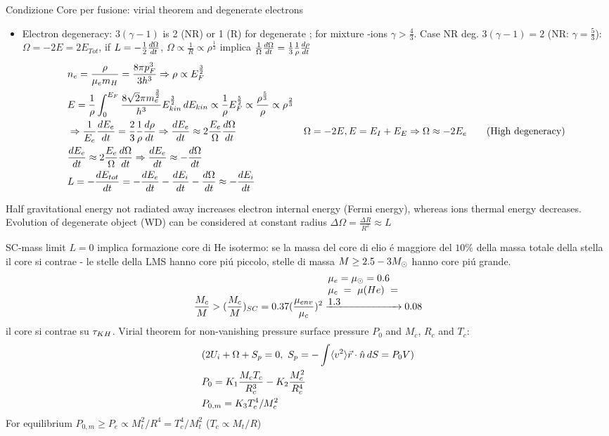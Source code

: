 \begin{frame}{Condizione Core per fusione: virial theorem and degenerate electrons}
    \begin{itemize}
        \item Electron degeneracy: $3(\gamma-1)$ is 2 (NR) or 1 (R) for degenerate \Pelectron; for mixture \Pelectron-ions $\gamma>\frac{4}{3}$. Case NR \Pelectron deg. $3(\gamma-1)=2$  (NR: $\gamma=\frac{5}{3}$): $\Omega=-2E=2E_{Tot}$, if $L=-\frac{1}{2}\TDy{t}{\Omega}$, $\Omega\propto \frac{1}{R}\propto\rho^{\frac{1}{3}}$ implica $\frac{1}{\Omega}\TDy{t}{\Omega}=\frac{1}{3}\frac{1}{\rho}\TDy{t}{\rho}$     
            \begin{align*}
                &n_e=\frac{\rho}{\mu_em_H}=\frac{8\pi p_F^3}{3h^3}\Rightarrow\rho\propto E_F^{\frac{3}{2}}\\
                &E=\frac{1}{\rho}\int_0^{E_F}\frac{8\sqrt{2}\pi m_e^{\frac{3}{2}}}{h^3}E_{kin}^{\frac{3}{2}}\,dE_{kin}\propto \frac{1}{\rho}E_F^{\frac{5}{2}}\propto \frac{\rho^{\frac{5}{3}}}{\rho}\propto\rho^{\frac{2}{3}}\\
                &\Rightarrow \frac{1}{E_e}\TDy{t}{E_e}=\frac{2}{3}\frac{1}{\rho}\TDy{t}{\rho}\Rightarrow\TDy{t}{E_e}\approx2 \frac{E_e}{\Omega}\TDy{t}{\Omega}
        &\Omega=-2E, E=E_I+E_E\Rightarrow \Omega\approx-2E_e\tag{High degeneracy}\\
        &\TDy{t}{E_e}\approx2 \frac{E_e}{\Omega}\TDy{t}{\Omega}\Rightarrow\TDy{t}{E_e}\approx-\TDy{t}{\Omega}\\
        &L=-\TDy{t}{E_{tot}}=-\TDy{t}{E_e}-\TDy{t}{E_i}-\TDy{t}{\Omega}\approx-\TDy{t}{E_i}
            \end{align*}
    \end{itemize}
    Half gravitational energy not radiated away increases electron internal energy (Fermi energy), whereas ions thermal energy decreases. Evolution of degenerate object (WD) can be considered at constant radius $\Delta\Omega=\frac{\Delta R}{R^2}\approx L$
\end{frame}

\begin{frame}{SC-mass limit} 
$L=0$ implica formazione core di He isotermo: se la massa del core di elio \'e maggiore del $10\%$ della massa totale della stella il core si contrae - le stelle della LMS hanno core pi\'u piccolo, stelle di massa $M\geq2.5-3\msun{}$  hanno core pi\'u grande.
\begin{equation*} 
\frac{M_c}{M}>(\frac{M_c}{M})_{SC}=0.37(\frac{\mu_{env}}{\mu_c})^2\xrightarrow{\parbox{2.5cm}{$\mu_e=\mu_{\odot}=0.6$\\$\mu_c=\mu(He)=1.3$}}0.08
\end{equation*}
il core si contrae su $\tkh{}$.
Virial theorem for non-vanishing pressure surface pressure $P_0$ and $M_c$, $R_c$ and $T_c$:
\begin{align*} 
&(2U_i+\Omega+S_p=0,\ S_p=-\int\exv{v^2}\Vec{r}\cdot\hat{n}\,dS=P_0V)\\
&P_0=K_1\frac{M_cT_c}{R_c^3}-K_2\frac{M_c^2}{R_c^4}\\
&P_{0,m}=K_3T_c^4/M_c^2
\end{align*}
For equilibrium $P_{0,m}\geq P_e\propto M_t^2/R^4=T_c^4/M_t^2$ ($T_c\propto M_t/R$)
\end{frame}

